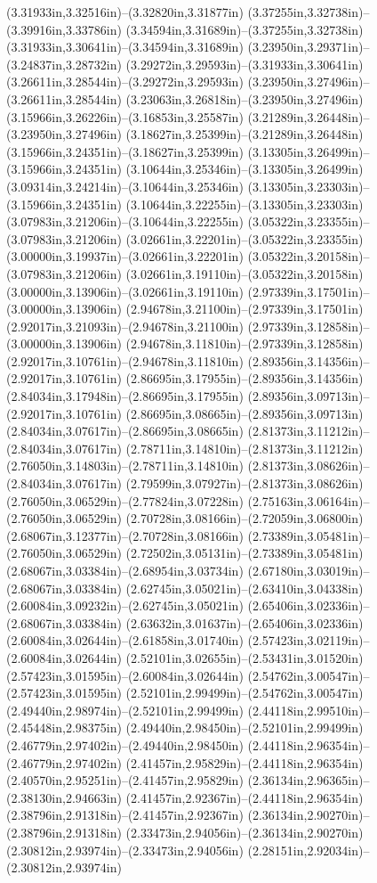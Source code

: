 (3.31933in,3.32516in)--(3.32820in,3.31877in) (3.37255in,3.32738in)--(3.39916in,3.33786in) (3.34594in,3.31689in)--(3.37255in,3.32738in) (3.31933in,3.30641in)--(3.34594in,3.31689in) (3.23950in,3.29371in)--(3.24837in,3.28732in) (3.29272in,3.29593in)--(3.31933in,3.30641in) (3.26611in,3.28544in)--(3.29272in,3.29593in) (3.23950in,3.27496in)--(3.26611in,3.28544in) (3.23063in,3.26818in)--(3.23950in,3.27496in) (3.15966in,3.26226in)--(3.16853in,3.25587in) (3.21289in,3.26448in)--(3.23950in,3.27496in) (3.18627in,3.25399in)--(3.21289in,3.26448in) (3.15966in,3.24351in)--(3.18627in,3.25399in) (3.13305in,3.26499in)--(3.15966in,3.24351in) (3.10644in,3.25346in)--(3.13305in,3.26499in) (3.09314in,3.24214in)--(3.10644in,3.25346in) (3.13305in,3.23303in)--(3.15966in,3.24351in) (3.10644in,3.22255in)--(3.13305in,3.23303in) (3.07983in,3.21206in)--(3.10644in,3.22255in) (3.05322in,3.23355in)--(3.07983in,3.21206in) (3.02661in,3.22201in)--(3.05322in,3.23355in) (3.00000in,3.19937in)--(3.02661in,3.22201in) (3.05322in,3.20158in)--(3.07983in,3.21206in) (3.02661in,3.19110in)--(3.05322in,3.20158in) (3.00000in,3.13906in)--(3.02661in,3.19110in) (2.97339in,3.17501in)--(3.00000in,3.13906in) (2.94678in,3.21100in)--(2.97339in,3.17501in) (2.92017in,3.21093in)--(2.94678in,3.21100in) (2.97339in,3.12858in)--(3.00000in,3.13906in) (2.94678in,3.11810in)--(2.97339in,3.12858in) (2.92017in,3.10761in)--(2.94678in,3.11810in) (2.89356in,3.14356in)--(2.92017in,3.10761in) (2.86695in,3.17955in)--(2.89356in,3.14356in) (2.84034in,3.17948in)--(2.86695in,3.17955in) (2.89356in,3.09713in)--(2.92017in,3.10761in) (2.86695in,3.08665in)--(2.89356in,3.09713in) (2.84034in,3.07617in)--(2.86695in,3.08665in) (2.81373in,3.11212in)--(2.84034in,3.07617in) (2.78711in,3.14810in)--(2.81373in,3.11212in) (2.76050in,3.14803in)--(2.78711in,3.14810in) (2.81373in,3.08626in)--(2.84034in,3.07617in) (2.79599in,3.07927in)--(2.81373in,3.08626in) (2.76050in,3.06529in)--(2.77824in,3.07228in) (2.75163in,3.06164in)--(2.76050in,3.06529in) (2.70728in,3.08166in)--(2.72059in,3.06800in) (2.68067in,3.12377in)--(2.70728in,3.08166in) (2.73389in,3.05481in)--(2.76050in,3.06529in) (2.72502in,3.05131in)--(2.73389in,3.05481in) (2.68067in,3.03384in)--(2.68954in,3.03734in) (2.67180in,3.03019in)--(2.68067in,3.03384in) (2.62745in,3.05021in)--(2.63410in,3.04338in) (2.60084in,3.09232in)--(2.62745in,3.05021in) (2.65406in,3.02336in)--(2.68067in,3.03384in) (2.63632in,3.01637in)--(2.65406in,3.02336in) (2.60084in,3.02644in)--(2.61858in,3.01740in) (2.57423in,3.02119in)--(2.60084in,3.02644in) (2.52101in,3.02655in)--(2.53431in,3.01520in) (2.57423in,3.01595in)--(2.60084in,3.02644in) (2.54762in,3.00547in)--(2.57423in,3.01595in) (2.52101in,2.99499in)--(2.54762in,3.00547in) (2.49440in,2.98974in)--(2.52101in,2.99499in) (2.44118in,2.99510in)--(2.45448in,2.98375in) (2.49440in,2.98450in)--(2.52101in,2.99499in) (2.46779in,2.97402in)--(2.49440in,2.98450in) (2.44118in,2.96354in)--(2.46779in,2.97402in) (2.41457in,2.95829in)--(2.44118in,2.96354in) (2.40570in,2.95251in)--(2.41457in,2.95829in) (2.36134in,2.96365in)--(2.38130in,2.94663in) (2.41457in,2.92367in)--(2.44118in,2.96354in) (2.38796in,2.91318in)--(2.41457in,2.92367in) (2.36134in,2.90270in)--(2.38796in,2.91318in) (2.33473in,2.94056in)--(2.36134in,2.90270in) (2.30812in,2.93974in)--(2.33473in,2.94056in) (2.28151in,2.92034in)--(2.30812in,2.93974in) 